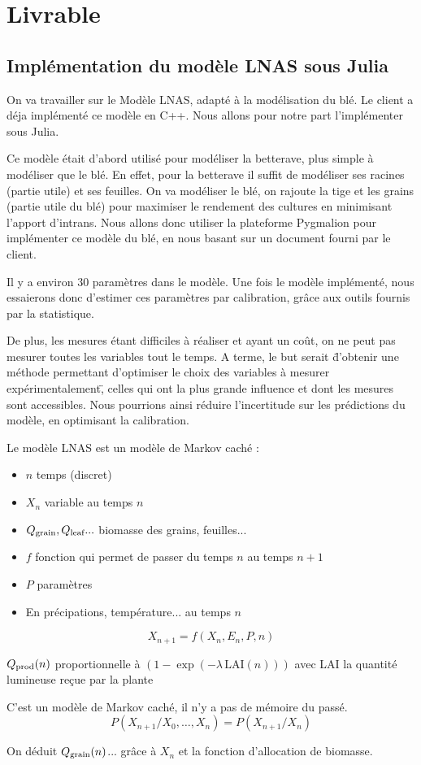 \section{Livrable}
\subsection{Implémentation du modèle LNAS sous Julia}
On va travailler sur le Modèle LNAS, adapté à la modélisation du blé. 
Le client a déja implémenté ce modèle en C++. 
Nous allons pour notre part l'implémenter sous Julia.

Ce modèle était d'abord utilisé pour modéliser la betterave, 
plus simple à modéliser que le blé. 
En effet, pour la betterave il suffit de modéliser 
ses racines (partie utile) et ses feuilles.
On va modéliser le blé, on rajoute la tige et les grains (partie utile du blé)
pour maximiser le rendement des cultures en minimisant l’apport d’intrans.
Nous allons donc utiliser la plateforme Pygmalion pour implémenter ce modèle du blé,
en nous basant sur un document fourni par le client.

Il y a environ 30 paramètres dans le modèle. Une fois le modèle implémenté, nous essaierons donc d'estimer ces paramètres par calibration, grâce aux outils fournis par la statistique.

De plus, les mesures étant difficiles à réaliser et ayant un coût, on ne peut pas mesurer toutes les variables tout le temps. A terme, le but serait \"d'obtenir une méthode permettant d'optimiser le choix des variables à mesurer expérimentalement\", celles qui ont la plus grande influence et dont les mesures sont accessibles. Nous pourrions ainsi réduire l'incertitude sur les prédictions du modèle, en optimisant la calibration.


Le modèle LNAS est un modèle de Markov caché : 
\begin{itemize}
  \item $n$  temps (discret)     
  \item $X_n$ variable au temps $n$       
  \item $Q_{\text{grain}}, Q_{\text{leaf}}... $ biomasse des grains, feuilles...      
  \item $f$ fonction qui permet de passer du temps $n$ au temps $n+1$     
  \item $P$ paramètres      
  \item En précipations, température... au temps $n$
\end{itemize}

\begin{equation}
  X_{n+1} = f(X_n,E_n,P,n)
\end{equation} 

$Q_{\text{prod}}(n)$ proportionnelle à $(1-\exp{(-\lambda \, \text{LAI}(n))})$ 
avec LAI la quantité lumineuse reçue par la plante

C’est un modèle de Markov caché, il n'y a pas de mémoire du passé.
\[
  P(X_{n+1}/X_0,…,X_n) = P(X_{n+1} / X_n) 
\] 

On déduit $Q_{\text{grain}}(n)$... grâce à $X_n$ et la fonction d'allocation de biomasse.
